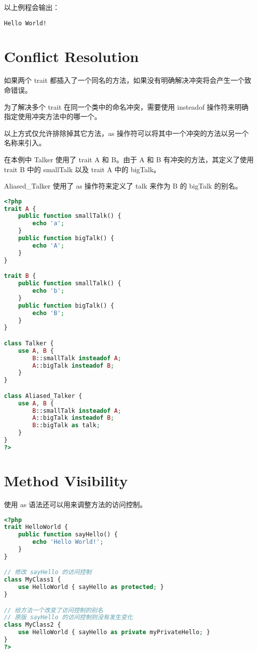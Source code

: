 以上例程会输出：

\begin{verbatim}
Hello World!
\end{verbatim}



\section{Conflict Resolution}

如果两个 trait 都插入了一个同名的方法，如果没有明确解决冲突将会产生一个致命错误。

为了解决多个 trait 在同一个类中的命名冲突，需要使用 insteadof 操作符来明确指定使用冲突方法中的哪一个。

以上方式仅允许排除掉其它方法，as 操作符可以将其中一个冲突的方法以另一个名称来引入。

在本例中 Talker 使用了 trait A 和 B。由于 A 和 B 有冲突的方法，其定义了使用 trait B 中的 smallTalk 以及 trait A 中的 bigTalk。

Aliased\_Talker 使用了 as 操作符来定义了 talk 来作为 B 的 bigTalk 的别名。

\begin{lstlisting}[language=PHP]
<?php
trait A {
    public function smallTalk() {
        echo 'a';
    }
    public function bigTalk() {
        echo 'A';
    }
}

trait B {
    public function smallTalk() {
        echo 'b';
    }
    public function bigTalk() {
        echo 'B';
    }
}

class Talker {
    use A, B {
        B::smallTalk insteadof A;
        A::bigTalk insteadof B;
    }
}

class Aliased_Talker {
    use A, B {
        B::smallTalk insteadof A;
        A::bigTalk insteadof B;
        B::bigTalk as talk;
    }
}
?>
\end{lstlisting}




\section{Method Visibility}

使用 as 语法还可以用来调整方法的访问控制。

\begin{lstlisting}[language=PHP]
<?php
trait HelloWorld {
    public function sayHello() {
        echo 'Hello World!';
    }
}

// 修改 sayHello 的访问控制
class MyClass1 {
    use HelloWorld { sayHello as protected; }
}

// 给方法一个改变了访问控制的别名
// 原版 sayHello 的访问控制则没有发生变化
class MyClass2 {
    use HelloWorld { sayHello as private myPrivateHello; }
}
?>
\end{lstlisting}




